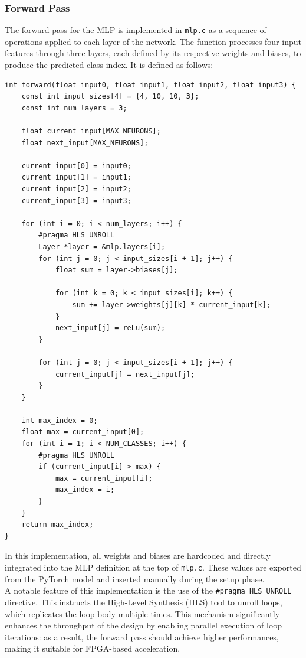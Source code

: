 \documentclass{article}
\begin{document}
\subsubsection{Forward Pass}
The forward pass for the MLP is implemented in \texttt{mlp.c} as a sequence of operations applied to each layer of the network. The function processes four input features through three layers, each defined by its respective weights and biases, to produce the predicted class index.
It is defined as follows:
\begin{lstlisting}
int forward(float input0, float input1, float input2, float input3) {
    const int input_sizes[4] = {4, 10, 10, 3}; 
    const int num_layers = 3;

    float current_input[MAX_NEURONS];
    float next_input[MAX_NEURONS];

    current_input[0] = input0;
    current_input[1] = input1;
    current_input[2] = input2;
    current_input[3] = input3;

    for (int i = 0; i < num_layers; i++) {
        #pragma HLS UNROLL
        Layer *layer = &mlp.layers[i];
        for (int j = 0; j < input_sizes[i + 1]; j++) {
            float sum = layer->biases[j];
            
            for (int k = 0; k < input_sizes[i]; k++) {
                sum += layer->weights[j][k] * current_input[k];
            }
            next_input[j] = reLu(sum);
        }

        for (int j = 0; j < input_sizes[i + 1]; j++) {
            current_input[j] = next_input[j];
        }
    }

    int max_index = 0;
    float max = current_input[0];
    for (int i = 1; i < NUM_CLASSES; i++) {
        #pragma HLS UNROLL
        if (current_input[i] > max) {
            max = current_input[i];
            max_index = i;
        }
    }
    return max_index;
}
\end{lstlisting}

In this implementation, all weights and biases are hardcoded and directly integrated into the MLP definition at the top of \texttt{mlp.c}. These values are exported from the PyTorch model and inserted manually during the setup phase.
\\A notable feature of this implementation is the use of the \texttt{\#pragma HLS UNROLL} directive. This instructs the High-Level Synthesis (HLS) tool to unroll loops, which replicates the loop body multiple times. This mechanism significantly enhances the throughput of the design by enabling parallel execution of loop iterations: as a result, the forward pass should achieve higher performances, making it suitable for FPGA-based acceleration.
\end{document}
